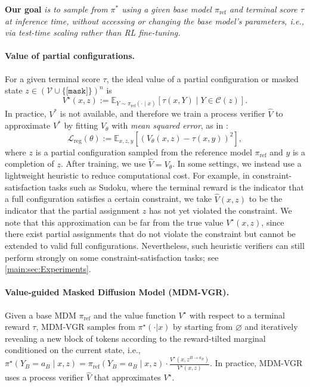\documentclass{article}
\numberwithin{theorem}{section}
\numberwithin{proposition}{section}
\numberwithin{corollary}{section}
\numberwithin{lemma}{section}
\numberwithin{conjecture}{section}
\numberwithin{remark}{section}
\numberwithin{definition}{section}
\numberwithin{assumption}{section}
\numberwithin{example}{section}
\newcommand{\calC}{{\mathcal{C}}}
\newcommand{\calL}{{\mathcal{L}}}
\newcommand{\calV}{{\mathcal{V}}}
\newcommand{\bbE}{\mathbb{E}}
\newcommand{\lbra}[1]{\left[#1\right]}
\newcommand{\sbra}[1]{\left(#1\right)}
\providecommand{\mask}{\texttt{[mask]}}
\providecommand{\base}{\pi_{\mathrm{ref}}}
\begin{document}
\textbf{Our goal} \emph{is to sample from $\pi^*$ using a given base model $\base$ and terminal score $\tau$ at inference time, without accessing or changing the base model's parameters, i.e., via test-time scaling rather than RL fine-tuning.}


\paragraph{Value of partial configurations.}
For a given terminal score $\tau$, the ideal value of a partial configuration or masked state $z\in (\calV\cup\{\mask\})^n$ is
\begin{equation*}\label{eq:ideal value masked state}
     V^\star(x,z)
    :=
    \mathbb E_{Y\sim \pi_{\mathrm{ref}}(\cdot \mid x)}\!\left[\tau(x,Y)\mid Y\in\calC(z)\right].
\end{equation*}
In practice, $V^*$ is not available, and therefore we train a process verifier $\widehat V$ to approximate $V^*$ by fitting $V_\theta$ with \textit{mean squared error}, as in \citet{rohatgi2025taming}:
\begin{equation*}
     \calL_{\mathrm{reg}}(\theta) := \bbE_{x,z,y}\lbra{\sbra{V_\theta(x,z)-\tau(x,y)}^2},
\end{equation*}
where $z$ is a partial configuration sampled from the reference model $\base$ and $y$ is a completion of $z$. After training, we use $\widehat V=V_\theta$. In some settings, we instead use a lightweight heuristic to reduce computational cost. For example, in constraint-satisfaction tasks such as Sudoku, where the terminal reward is the indicator that a full configuration satisfies a certain constraint, we take $\widehat V(x,z)$ to be the indicator that the partial assignment $z$ has not yet violated the constraint. We note that this approximation can be far from the true value $V^\star(x,z)$, since there exist partial assignments that do not violate the constraint but cannot be extended to valid full configurations. Nevertheless, such heuristic verifiers can still perform strongly on some constraint-satisfaction tasks; see \cref{main:sec:Experiments}. 


\paragraph{Value-guided Masked Diffusion Model (MDM-VGR).} Given a base MDM $\base$ and  the value function $ V^\star$ with respect to a terminal reward $\tau$, MDM-VGR samples from $\pi^\star(\cdot |x)$ by starting from $\varnothing$ and iteratively revealing a new block of tokens according to the reward-tilted marginal conditioned on the current state, i.e., $\pi^\star(Y_B=a_B\mid x,z)
    =
    \base(Y_B=a_B\mid x,z)\cdot
    \frac{V^\star(x,z^{B\rightarrow a_B})}{V^\star(x,z)}.$ In practice, MDM-VGR uses a  process verifier $\hat{V}$ that approximates $ V^\star.$ 
\end{document}

